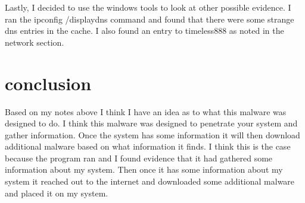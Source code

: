 \documentclass[letterpaper, onecolumn,10pt]{IEEEtran}
\begin{document}
		    Lastly, I decided to use the windows tools to look at other possible evidence. I ran the ipconfig /displaydns command and found that there were some strange dns entries in the cache. I also found an entry to timeless888 as noted in the network section.\\
		    
		 \section{conclusion} Based on my notes above I think I have an idea as to what this malware was designed to do. I think this malware was designed to penetrate your system and gather information. Once the system has some information it will then download additional malware based on what information it finds. I think this is the case because the program ran and I found evidence that it had gathered some information about my system. Then once it has some information about my system it reached out to the internet and downloaded some additional malware and placed it on my system.\\
		    
		
\end{document}
